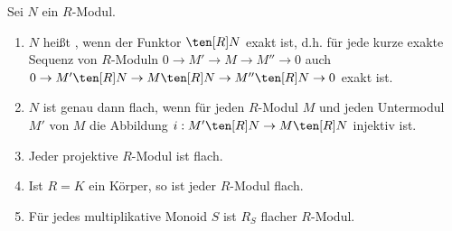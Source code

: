 
\begin{DefProp}
\label{1.13}
  Sei $N$ ein $R$-Modul.
  \begin{enumerate}
    \item $N$ hei\ss t , wenn der Funktor $\ten[R] N$ exakt ist,
    d.h. f\"ur jede kurze exakte Sequenz von $R$-Moduln 
    $0\to M'\to M\to M''\to 0$
    auch $0\to M'\ten[R] N\to M\ten[R] N\to M''\ten[R] N\to 0$ exakt ist.
    \item $N$ ist genau dann flach, wenn f\"ur jeden $R$-Modul $M$ und jeden Untermodul $M'$ von $M$
    die Abbildung $i:M'\ten[R] N\to M\ten[R] N$ injektiv ist.
    \item Jeder projektive $R$-Modul ist flach.
    \item Ist $R=K$ ein K\"orper, so ist jeder $R$-Modul flach.
    \item F\"ur jedes multiplikative Monoid $S$ ist $R_S$ flacher $R$-Modul.
  \end{enumerate}
\end{DefProp}

